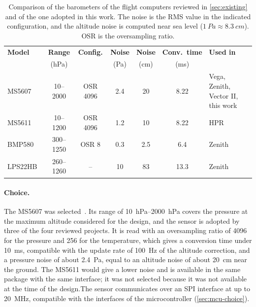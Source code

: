 \begin{table}[htb]
    \centering
    \small
    \caption{Comparison of the barometers of the flight computers reviewed in \cref{sec:existing} and of the one adopted in this work. The noise is the RMS value in the indicated configuration, and the altitude noise is computed near sea level ($\SI{1}{Pa}\approx\SI{8.3}{cm}$). OSR is the oversampling ratio.}
    \label{tab:baro-comparison}
    \begin{tabularx}{\textwidth}{@{}l c c c c c >{\raggedright\arraybackslash}X@{}}
        \toprule
        \textbf{Model} & \textbf{Range} & \textbf{Config.} & \textbf{Noise} & \textbf{Noise} & \textbf{Conv.\ time} & \textbf{Used in} \\
        & {\footnotesize (\unit{\hecto\pascal})} & & {\footnotesize (\unit{\pascal})} & {\footnotesize (\unit{\centi\metre})} & {\footnotesize (\unit{\milli\second})} & \\
        \midrule
        MS5607~\cite{ms5607:datasheet} & \numrange{10}{2000} & OSR 4096 & 2.4 & 20 & 8.22 & Vega, Zenith, Vector II, this work \\
        MS5611~\cite{ms5611:datasheet} & \numrange{10}{1200} & OSR 4096 & 1.2 & 10 & 8.22 & HPR \\
        BMP580~\cite{bmp580:datasheet} & \numrange{300}{1250} & OSR 8 & 0.3 & 2.5 & 6.4 & Zenith \\
        LPS22HB~\cite{lps22hb:datasheet} & \numrange{260}{1260} & -- & 10 & 83 & 13.3 & Zenith \\
        \bottomrule
    \end{tabularx}
\end{table}

\paragraph{Choice.} The MS5607 was selected~\cite{ms5607:datasheet}. Its range of \SIrange{10}{2000}{hPa} covers the pressure at the maximum altitude considered for the design, and the sensor is adopted by three of the four reviewed projects. It is read with an oversampling ratio of 4096 for the pressure and 256 for the temperature, which gives a conversion time under \SI{10}{\milli\second}, compatible with the update rate of \SI{100}{\Hz} of the altitude correction, and a pressure noise of about \SI{2.4}{\Pa}, equal to an altitude noise of about \SI{20}{\cm} near the ground. The MS5611 would give a lower noise and is available in the same package with the same interface; it was not selected because it was not available at the time of the design.The sensor communicates over an SPI interface at up to \SI{20}{MHz}, compatible with the interfaces of the microcontroller (\cref{sec:mcu-choice}). 

